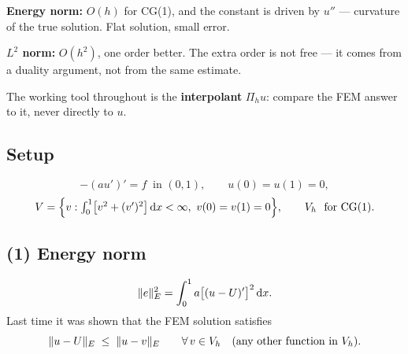
\begin{roadmap}[Lecture 7]
\begin{roadlist}
\item \textbf{Energy norm:} $O(h)$ for CG(1), and the constant is driven by
  $u''$ --- curvature of the true solution. Flat solution, small error.
\item \textbf{$L^{2}$ norm:} $O(h^{2})$, one order better. The extra order is
  not free --- it comes from a duality argument, not from the same estimate.
\item The working tool throughout is the \textbf{interpolant} $\Pi_h u$:
  compare the FEM answer to it, never directly to $u$.
\end{roadlist}
\end{roadmap}

\subsection*{Setup}

\begin{equation}\label{eq:l7setup}
  -(au')'=f \ \text{ in } (0,1),\qquad u(0)=u(1)=0,
\end{equation}
\begin{equation}\label{eq:l7V}
  \Vsp=\Bigl\{v:\textstyle\int_0^1\bigl[v^2+(v')^2\bigr]\dx<\infty,\ v(0)=v(1)=0\Bigr\},
  \qquad \Vh \ \text{ for CG(1)}.
\end{equation}

\subsection*{(1) Energy norm}

\begin{equation}\label{eq:l7enorm}
  \lVert e\rVert_{E}^{2}=\int_0^1 a\bigl[(u-U)'\bigr]^{2}\,\mathrm{d} x .
\end{equation}
Last time it was shown that the FEM solution satisfies
\begin{equation}\label{eq:l7cea}
  \lVert u-U\rVert_{E}\;\le\;\lVert u-v\rVert_{E}
  \qquad\forall\,v\in V_{h}
  \quad\text{(any other function in } V_{h}).
\end{equation}

